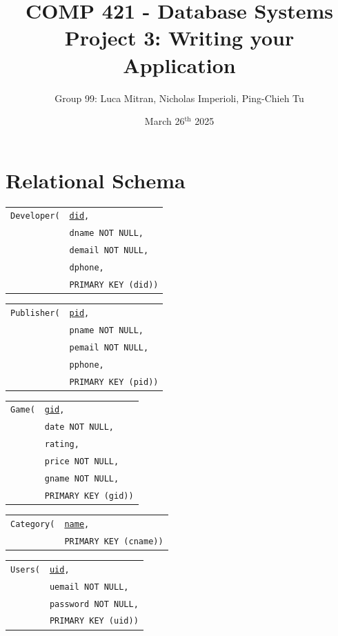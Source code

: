 \documentclass[12pt, oneside]{article}
\title{COMP 421 - Database Systems\\
        \large Project 3: Writing your Application}
\author{Group 99: Luca Mitran, Nicholas Imperioli, Ping-Chieh Tu}
\date{March 26$^{\text{th}}$ 2025}
\begin{document}
\maketitle
\section{Relational Schema}
\begin{tabular}{l@{}l}
    \texttt{Developer(} & \texttt{\underline{did},}\\
                         & \texttt{dname NOT NULL,}\\
                         & \texttt{demail NOT NULL,}\\
                         & \texttt{dphone,}\\
                         & \texttt{PRIMARY KEY (did))}
\end{tabular}

\begin{tabular}{l@{}l}
    \texttt{Publisher(} & \texttt{\underline{pid},}\\
                         & \texttt{pname NOT NULL,}\\
                         & \texttt{pemail NOT NULL,}\\
                         & \texttt{pphone,}\\
                         & \texttt{PRIMARY KEY (pid))}
\end{tabular}

\begin{tabular}{l@{}l}
    \texttt{Game(} & \texttt{\underline{gid},}\\
                    & \texttt{date NOT NULL,}\\
                    & \texttt{rating,}\\
                    & \texttt{price NOT NULL,}\\
                    & \texttt{gname NOT NULL,}\\
                    & \texttt{PRIMARY KEY (gid))}
\end{tabular}

\begin{tabular}{l@{}l}
    \texttt{Category(} & \texttt{\underline{name},}\\
                        & \texttt{PRIMARY KEY (cname))}
\end{tabular}

\begin{tabular}{l@{}l}
    \texttt{Users(} & \texttt{\underline{uid},}\\
                     & \texttt{uemail NOT NULL,}\\
                     & \texttt{password NOT NULL,}\\
                     & \texttt{PRIMARY KEY (uid))}
\end{tabular}
\end{document}
